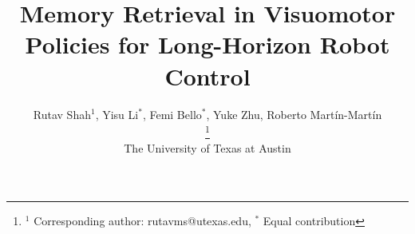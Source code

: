\documentclass[conference]{IEEEtran}
\begin{document}
\title{Memory Retrieval in Visuomotor Policies for Long-Horizon Robot Control}



\author{
Rutav Shah$^{1}$, 
Yisu Li$^{*}$, 
Femi Bello$^{*}$, 
Yuke Zhu, 
Roberto Mart{\'i}n-Mart{\'i}n \\
\vspace{-8pt}
\thanks{$^1$ Corresponding author: rutavms@utexas.edu, $^{*}$ Equal contribution} \\
The University of Texas at Austin
\vspace{-5pt}
}


\maketitle
\end{document}
